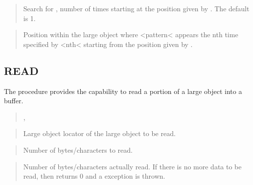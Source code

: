 \documentclass[letterpaper,10pt,english,openany,oneside]{sphinxmanual}
\begin{document}
\begin{quote}

Search for ,  number of times starting at the position
given by . The default is 1.
\end{quote}

\begin{quote}

Position within the large object where \textless{}pattern\textless{} appears the nth time
specified by \textless{}nth\textless{} starting from the position given by .
\end{quote}

\newpage


\subsection{READ}
\label{\detokenize{read::doc}}\label{\detokenize{read:read}}
The  procedure provides the capability to read a portion of a large
object into a buffer.
\begin{quote}

,
\begin{quote}

\end{quote}
\end{quote}


\begin{quote}

Large object locator of the large object to be read.
\end{quote}

\begin{quote}

Number of bytes/characters to read.
\end{quote}

\begin{quote}

Number of bytes/characters actually read. If there is no more data to be
read, then  returns 0 and a  exception is
thrown.
\end{quote}
\end{document}
